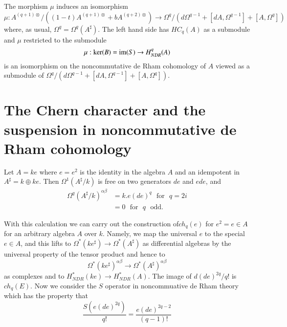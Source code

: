 \begin{theorem}\label{chap7-thm3.3}
The morphism $\mu$ induces an isomorphism
{\fontsize{10}{12}\selectfont
$$
\mu:A^{(q+1)\otimes}/((1-t)A^{(q+1)\otimes}+bA^{(q+2)\otimes})\to
\Omega^{q}/(d\Omega^{q-1}+[dA,\Omega^{q-1}]+[A,\Omega^{q}]) 
$$}
where, as usual, $\Omega^{q}=\Omega^{q}(A^{\sharp})$. The left hand
side has $HC_{q}(A)$ as a submodule and $\mu$ restricted to the
submodule
$$
\mu:\ker(B)=\operatorname{im}(S)\to H^{q}_{NDR}(A)
$$
is an isomorphism on the noncommutative de Rham cohomology of $A$
viewed as a submodule of
$\Omega^{q}/(d\Omega^{q-1}+[dA,\Omega^{q-1}]+[A,\Omega^{q}])$. 
\end{theorem}

\section[The Chern character and the suspension...]{The Chern
  character and the suspension in noncommutative de 
  Rham cohomology}\label{chap7-sec4}

\begin{example}\label{chap7-exam4.1}
Let $A=ke$ where $e=e^{2}$ is the identity in the algebra $A$ and an
idempotent in $A^{\sharp}=k\oplus ke$. Then $\Omega^{1}(A^{\sharp}/k)$
is free on two generators $de$ and $ede$, and
\begin{align*}
\Omega^{q}(A^{\sharp}/k)^{\alpha\beta} &= k.e(de)^{q}\text{~ for~ }
q=2i\\
&=0\text{~ for~ }q \text{~ odd.}
\end{align*}
\end{example}

\begin{remark}\label{chap7-rem4.2}
With this calculation we can carry out the construction
of\pageoriginale $ch_{q}(e)$ for $e^{2}=e\in A$ for an arbitrary
algebra $A$ over $k$. Namely, we map the universal $e$ to the special
$e\in A$, and this lifts to $\Omega^{*}(ke^{\sharp})\to
\Omega^{*}(A^{\sharp})$ as differential algebras by the universal
property of the tensor product and hence to
$$
\Omega^{*}(ke^{\sharp})^{\alpha\beta}\to
\Omega^{*}(A^{\sharp})^{\alpha\beta}
$$
as complexes and to $H^{*}_{NDR}(ke)\to H^{*}_{NDR}(A)$. The image of
$d(de)^{2q}/q!$ is $ch_{q}(E)$. Now we consider the $S$ operator in
noncommuative de Rham theory which has the property that 
$$
\frac{S(e(de)^{2q})}{q!}=\frac{e(de)^{2q-2}}{(q-1)!}
$$
\end{remark}

